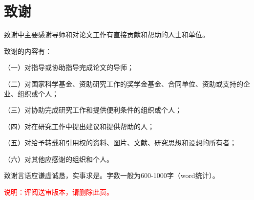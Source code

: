 
    \chapter{致\hspace{1em}谢}
    致谢中主要感谢导师和对论文工作有直接贡献和帮助的人士和单位。
    
    致谢的内容有：

    （一）对指导或协助指导完成论文的导师；

    （二）对国家科学基金、资助研究工作的奖学金基金、合同单位、资助或支持的企业、组织或个人；

    （三）对协助完成研究工作和提供便利条件的组织或个人；

    （四）对在研究工作中提出建议和提供帮助的人；

    （五）对给予转载和引用权的资料、图片、文献、研究思想和设想的所有者；

    （六）对其他应感谢的组织和个人。

    致谢言语应谦虚诚恳，实事求是。字数一般为600-1000字（word统计）。

    \textcolor{red}{
        说明：评阅送审版本，请删除此页。
    }
